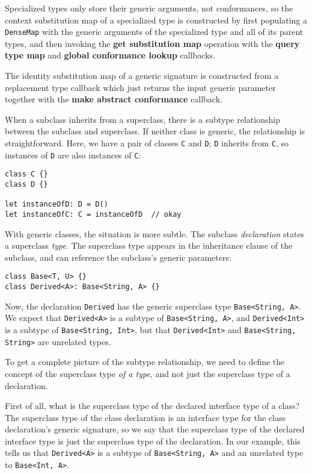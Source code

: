 \documentclass[../generics]{subfiles}
\begin{document}
Specialized types only store their generic arguments, not conformances, so the context substitution map of a specialized type is constructed by first populating a \texttt{DenseMap} with the generic arguments of the specialized type and all of its parent types, and then invoking the \textbf{get substitution map} operation with the \textbf{query type map} and \textbf{global conformance lookup} callbacks.

The identity substitution map of a generic signature is constructed from a replacement type callback which just returns the input generic parameter together with the \textbf{make abstract conformance} callback.

\iffalse

When a subclass inherits from a superclass, there is a subtype relationship between the subclass and superclass. If neither class is generic, the relationship is straightforward. Here, we have a pair of classes \texttt{C} and \texttt{D}; \texttt{D} inherits from \texttt{C}, so instances of \texttt{D} are also instances of \texttt{C}:
\begin{Verbatim}
class C {}
class D {}

let instanceOfD: D = D()
let instanceOfC: C = instanceOfD  // okay
\end{Verbatim}
With generic classes, the situation is more subtle. The subclass \emph{declaration} states a superclass \emph{type}. The superclass type appears in the inheritance clause of the subclass, and can reference the subclass's generic parameters:
\begin{Verbatim}
class Base<T, U> {}
class Derived<A>: Base<String, A> {}
\end{Verbatim}
Now, the declaration \texttt{Derived} has the generic superclass type \texttt{Base<String, A>}. We expect that \texttt{Derived<A>} is a subtype of \texttt{Base<String, A>}, and \texttt{Derived<Int>} is a subtype of \texttt{Base<String, Int>}, but that \texttt{Derived<Int>} and \texttt{Base<String, String>} are unrelated types.

To get a complete picture of the subtype relationship, we need to define the concept of the superclass type \emph{of a type}, and not just the superclass type of a declaration.

First of all, what is the superclass type of the declared interface type of a class? The superclass type of the class declaration is an interface type for the class declaration's generic signature, so we say that the superclass type of the declared interface type is just the superclass type of the declaration. In our example, this tells us that \texttt{Derived<A>} is a subtype of \texttt{Base<String, A>} and an unrelated type to \texttt{Base<Int, A>}.
\end{document}
